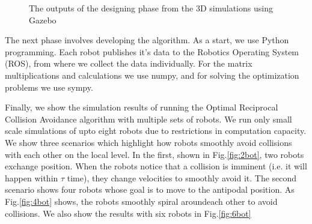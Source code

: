 \documentclass[12pt]{report}
\begin{document}
\begin{figure}[h]
\begin{subfigure}{0.48\textwidth}
    \caption{} \label{fig:multi}
  \end{subfigure}%
  \hspace*{\fill} 
 \caption{The outputs of the designing phase from the 3D simulations using Gazebo}  \label{fig:gazebo}
\end{figure}

The next phase involves developing the algorithm. As a start, we use Python programming. Each robot publishes it's data to the Robotics Operating System (ROS), from where we collect the data individually. For the matrix multiplications and calculations we use numpy, and for solving the optimization problems we use sympy. 

Finally, we show the simulation results of running the Optimal Reciprocal Collision Avoidance algorithm with multiple sets of robots. We run only small scale simulations of upto eight robots due to restrictions in computation capacity. We show three scenarios which highlight how robots smoothly avoid collisions with each other on the local level. In the first, shown in Fig.\ref{fig:2bot}, two robots exchange position. When the robots notice that a collision is imminent (i.e. it will happen within $\tau$ time), they change velocities to smoothly avoid it. The second scenario shows four robots whose goal is to move to the antipodal position. As Fig.\ref{fig:4bot} shows, the robots smoothly spiral aroundeach other to avoid collisions. We also show the results with six robots in Fig.\ref{fig:6bot}
\end{document}
